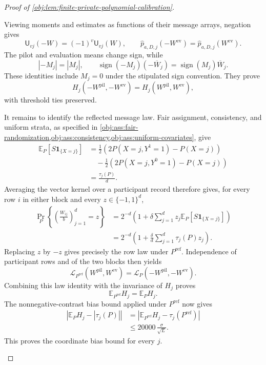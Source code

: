\begin{proof}[Proof of \cref{obj:lem:finite-private-polynomial-calibration}]
\begin{enumerate}
Viewing moments and estimates as functions of their message arrays, negation gives
\[
\mathsf U_{vj}(-W)=(-1)^v\mathsf U_{vj}(W),
\qquad
\widehat p_{a,D,j}(-W^{\mathrm{ev}})
=\widehat p_{a,D,j}(W^{\mathrm{ev}}).
\]
The pilot and evaluation means change sign, while
\[
|-M_j|=|M_j|,
\qquad
\operatorname{sign}(-M_j)(-\overline W_j)
=\operatorname{sign}(M_j)\overline W_j.
\]
These identities include \(M_j=0\) under the stipulated sign convention. They prove
\[
H_j(-W^{\mathrm{pil}},-W^{\mathrm{ev}})
=H_j(W^{\mathrm{pil}},W^{\mathrm{ev}}),
\]
with threshold ties preserved.

It remains to identify the reflected message law. Fair assignment, consistency, and uniform strata, as specified in
\cref{obj:ass:fair-randomization,obj:ass:consistency,obj:ass:uniform-covariates}, give
\[
\begin{aligned}
\mathbb E_P[S\mathbf1_{\{X=j\}}]
&=\frac12\left(2P(X=j,Y^1=1)-P(X=j)\right)\\
&\quad-\frac12\left(2P(X=j,Y^0=1)-P(X=j)\right)\\
&=\frac{\tau_j(P)}d.
\end{aligned}
\]
Averaging the vector kernel over a participant record therefore gives, for every row \(i\) in either block and every \(z\in\{-1,1\}^d\),
\[
\begin{aligned}
\Pr_P\!\left\{\left(\frac{W_{ij}}b\right)_{j=1}^d=z\right\}
&=2^{-d}\left(1+\delta\sum_{j=1}^d
 z_j\mathbb E_P[S\mathbf1_{\{X=j\}}]\right)\\
&=2^{-d}\left(1+\frac\delta d\sum_{j=1}^d\tau_j(P)z_j\right).
\end{aligned}
\]
Replacing \(z\) by \(-z\) gives precisely the row law under \(P^{\mathrm{ref}}\). Independence of participant rows and of the two blocks then yields
\[
\mathcal L_{P^{\mathrm{ref}}}(W^{\mathrm{pil}},W^{\mathrm{ev}})
=\mathcal L_P(-W^{\mathrm{pil}},-W^{\mathrm{ev}}).
\]
Combining this law identity with the invariance of \(H_j\) proves
\[
\mathbb E_{P^{\mathrm{ref}}}H_j=\mathbb E_PH_j.
\]
The nonnegative-contrast bias bound applied under \(P^{\mathrm{ref}}\) now gives
\[
\begin{aligned}
\left|\mathbb E_PH_j-|\tau_j(P)|\right|
&=\left|\mathbb E_{P^{\mathrm{ref}}}H_j
       -\tau_j(P^{\mathrm{ref}})\right|\\
&\le20000\,\frac{\sigma}{\sqrt L}.
\end{aligned}
\]
This proves the coordinate bias bound for every \(j\).


\end{enumerate}
\end{proof}
